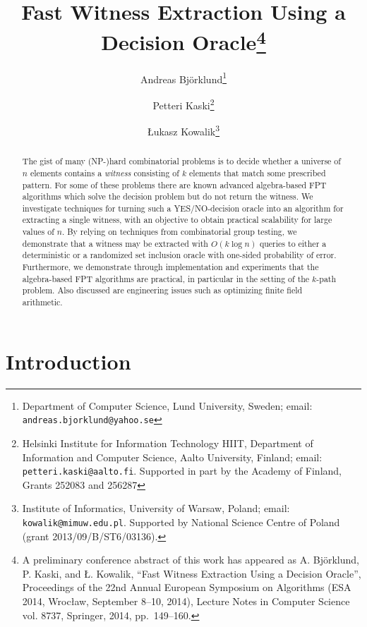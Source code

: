 \documentclass[11pt]{article}
\begin{document}
\title{Fast Witness Extraction Using a Decision Oracle\thanks{A preliminary conference abstract of this work has appeared as A. Bj\"orklund, P. Kaski, and \L. Kowalik, ``Fast Witness Extraction Using a Decision Oracle'', Proceedings of the 22nd Annual European Symposium on Algorithms (ESA 2014, Wroc{\l}aw, September 8--10, 2014),  Lecture Notes in Computer Science vol. 8737, Springer, 2014, pp.~149--160.}}
\author{
  Andreas Bj\"orklund\thanks{Department of Computer Science, Lund University, Sweden; email: \texttt{andreas.bjorklund@yahoo.se}}
  \and
  Petteri Kaski\thanks{Helsinki Institute for Information Technology HIIT, Department of Information and Computer Science, Aalto University, Finland; email:
\texttt{petteri.kaski@aalto.fi}. Supported in part by the Academy of Finland, Grants 252083 and 256287}
  \and
  \L{}ukasz Kowalik\thanks{Institute of Informatics, University of Warsaw, Poland; email: \texttt{kowalik@mimuw.edu.pl}. Supported by National Science Centre of Poland (grant 2013/09/B/ST6/03136).}
}

\date{}

\maketitle

\begin{abstract}
The gist of many (NP-)hard combinatorial problems is to decide
whether a universe of $n$ elements contains a {\em witness} consisting 
of $k$ elements that match some prescribed pattern. 
For some of these problems there are known advanced algebra-based 
FPT algorithms which solve the decision problem but do not return the witness.
We investigate techniques for turning such a YES/NO-decision oracle into 
an algorithm for extracting a single witness,
with an objective to obtain practical scalability for large values of $n$.
By relying on techniques from combinatorial group testing, we demonstrate
that a witness may be extracted with $O(k\log n)$ queries to 
either a deterministic or a randomized set inclusion oracle with one-sided
probability of error. Furthermore, we demonstrate through implementation
and experiments that the algebra-based FPT algorithms are practical,
in particular in the setting of the $k$-path problem. Also discussed
are engineering issues such as optimizing finite field arithmetic.
\end{abstract}






\section{Introduction}
\end{document}
